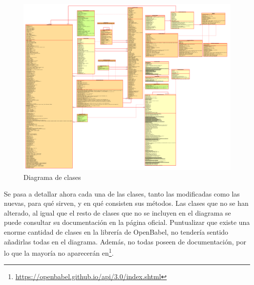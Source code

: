 \begin{landscape}

    \begin{figure}[]
        \centering
        \includegraphics[scale=0.7]{imagenes/diseno/diagramaClasesHorizontal_cropped.pdf}
        \caption{Diagrama de clases}
        \label{fig:diagrama_clases}
    \end{figure}
\end{landscape}

% 


Se pasa a detallar ahora cada una de las clases, tanto las modificadas como las nuevas, para qué sirven, y en qué consisten sus métodos. Las clases que no se han alterado, al igual que el resto de clases que no se incluyen en el diagrama se puede consultar su documentación en la página oficial\footnotemark. Puntualizar que existe una enorme cantidad de clases en la librería de OpenBabel, no tendería sentido añadirlas todas en el diagrama. Además, no todas poseen de documentación, por lo que la mayoría no aparecerán en\footnote[1]{\url{https://openbabel.github.io/api/3.0/index.shtml}}.


